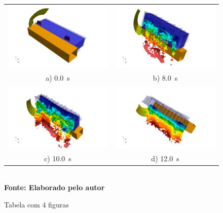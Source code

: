 			\begin{figure}[!ht]
				\setlength{\baselineskip}{\baselineskip} %
				\centering	
				\begin{tabular}{ c c }
				\caption[\hspace{0.1cm} Tabela com 4 figuras]{Tabela com 4 figuras}
					\includegraphics[width=.5\textwidth, height=.3\textwidth]{midias/figura6-1.png} &
					\includegraphics[width=.5\textwidth, height=.3\textwidth]{midias/figura6-2.png} \\
					a) \SI{0.0}{\second} & b) \SI{8.0}{\second} \\
					\includegraphics[width=.5\textwidth, height=.3\textwidth]{midias/figura6-3.png} &
					\includegraphics[width=.5\textwidth, height=.3\textwidth]{midias/figura6-4.png} \\
					c) \SI{10.0}{\second} & d) \SI{12.0}{\second} \\
				\end{tabular}
				\\
				\textbf{\footnotesize Fonte: Elaborado pelo autor}
				\label{fig2}
			\end{figure}
		
